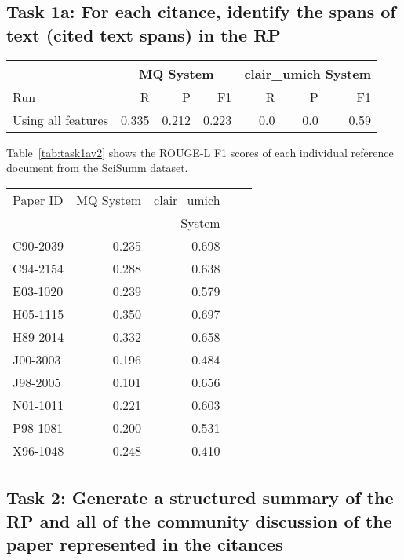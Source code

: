 \documentclass[11pt]{article}
\begin{document}
\subsection{Task 1a: For each citance, identify the spans of text 
			(cited text spans) in the RP}

\begin{table*}
\centering
	\begin{tabular}{|l|r|r|r|r|r|r|}
	\hline
	& \multicolumn{3}{|c|}{MQ System} & \multicolumn{3}{|c|}{clair\_umich System}\\
	\hline
	Run & R & P & F1 & R & P & F1\\
	\hline
	Using all features & 0.335 & 0.212 & 0.223 & 0.0 & 0.0 & 0.59\\
	\hline
	\end{tabular}
\caption{ROUGE-L results of the participating systems for task 1a}
\label{tab:task1a}
\end{table*}

Table~\ref{tab:task1av2} shows the ROUGE-L F1 scores of each individual reference document from the SciSumm dataset.

\begin{table*}
  \centering
  \begin{tabular}{|l|r|r|r|r|}
  	\hline
	Paper ID & MQ System & clair\_umich \\
	&	&	System\\
	\hline
	C90-2039 & 0.235 & 0.698\\ 
	C94-2154 & 0.288 & 0.638\\
	E03-1020 & 0.239 & 0.579\\
	H05-1115 & 0.350 & 0.697\\
	H89-2014 & 0.332 & 0.658\\
	J00-3003 & 0.196 & 0.484\\
	J98-2005 & 0.101 & 0.656\\
	N01-1011 & 0.221 & 0.603\\
	P98-1081 & 0.200 & 0.531\\
	X96-1048 & 0.248 & 0.410\\
	\hline
  \end{tabular}
\caption{ROUGE-L F1 results for individual topics 1a}
\label{tab:task1av2}
\end{table*}

\subsection{Task 2: Generate a structured summary of the RP and all of the 
			community discussion of the paper represented in the citances}
\end{document}
